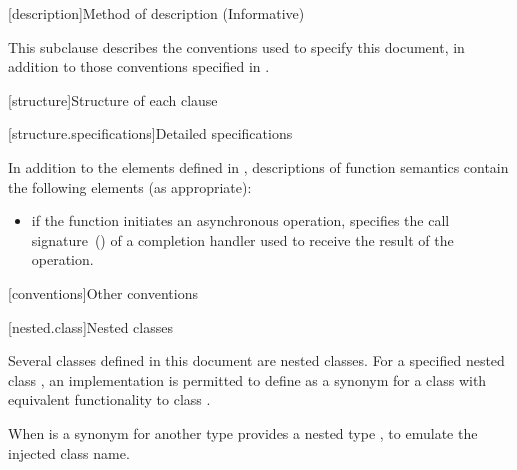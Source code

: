 
[description]{Method of description (Informative)}

\pnum
 This subclause describes the conventions used to specify this document, in addition to those conventions specified in .


[structure]{Structure of each clause}


[structure.specifications]{Detailed specifications}

\pnum
In addition to the elements defined in , descriptions of function semantics contain the following elements (as appropriate):

\begin{itemize}
\item
\completionsig if the function initiates an asynchronous operation, specifies the call signature~() of a completion handler used to receive the result of the operation.
\end{itemize}




[conventions]{Other conventions}


[nested.class]{Nested classes}

\pnum
Several classes defined in this document are nested classes.
For a specified nested class , an implementation is permitted to
define  as a synonym for a class with equivalent functionality to
class . \begin{note} When  is a synonym for another
type  provides a nested type , to emulate the injected
class name. \end{note}


